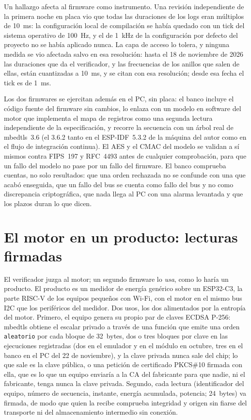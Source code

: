 Un hallazgo afecta al firmware como instrumento. Una revisión
independiente de la primera noche en placa vio que todas las duraciones
de los logs eran múltiplos de 10~ms: la configuración local de
compilación se había quedado con un tick del sistema operativo de
100~Hz, y el de 1~kHz de la configuración por defecto del proyecto no se
había aplicado nunca. La capa de acceso lo tolera, y ninguna medida se
vio afectada salvo en esa resolución: hasta el 18 de noviembre de 2026
las duraciones que da el verificador, y las frecuencias de los anillos
que salen de ellas, están cuantizadas a 10~ms, y se citan con esa
resolución; desde esa fecha el tick es de 1~ms.

Los dos firmwares se ejercitan además en el PC, sin placa: el banco
incluye el código fuente del firmware sin cambios, lo enlaza con un
modelo en software del motor que implementa el mapa de registros como
una segunda lectura independiente de la especificación, y recorre la
secuencia con un árbol real de mbedtls~3.6 (el 3.6.2 tanto en el
ESP-IDF~5.3.2 de la máquina del autor como en el flujo de integración
continua). El AES y el CMAC del modelo se validan a sí mismos contra FIPS~197 y
RFC~4493 antes de cualquier comprobación, para que un fallo del modelo
no pase por un fallo del firmware. El banco comprueba cuentas, no solo
resultados: que una orden rechazada no se confunde con una que acabó
enseguida, que un fallo del bus se cuenta como fallo del bus y no como
discrepancia criptográfica, que nada llega al PC con una alarma
levantada y que los plazos duran lo que dicen.

\section{El motor en un producto: lecturas firmadas}
\label{sec:lecturas_firmadas}

El verificador juzga al motor; un segundo firmware lo \emph{usa}, como
lo haría un producto. El producto es un medidor de energía genérico
sobre un ESP32-C3, la parte RISC-V de los equipos pequeños con Wi-Fi,
con el motor en el mismo bus \ac{I2C} que los periféricos del medidor.
Dos usos, los dos alimentados por la entropía del motor. Primero, el
equipo genera su propio par de claves ECDSA P-256: mbedtls obtiene el
escalar privado a través de una función que emite una orden
\texttt{aleatorio} por cada bloque de 32~bytes, dos o tres bloques por
clave en las ejecuciones registradas (dos en el emulador y en el módulo
en octubre, tres en el banco en el PC del 22 de noviembre), y la clave
privada nunca sale del chip; lo que sale es la clave pública, o
una petición de certificado PKCS\#10 firmada con ella, que es lo que un
equipo enviaría a la CA del fabricante para que nadie, ni el fabricante,
tenga nunca la clave privada. Segundo, cada lectura (identificador del
equipo, número de secuencia, instante, energía acumulada, potencia;
24~bytes) va firmada, de modo que quien la recibe comprueba integridad
y origen sin fiarse del transporte ni del almacenamiento intermedio sin
conexión.

